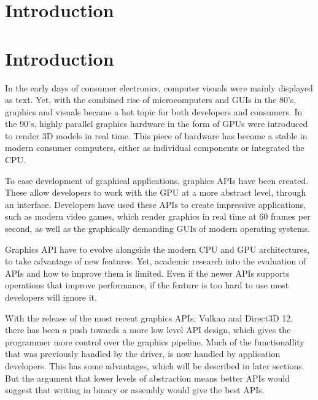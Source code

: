 \chapter{Introduction}\label{ch:introduction}
\chapter{Introduction}\label{ch:introduction}
In the early days of consumer electronics, computer visuals were mainly displayed as text.
Yet, with the combined rise of microcomputers and \glspl{GUI} in the 80's, graphics and visuals became a hot topic for both developers and consumers.  
In the 90's, highly parallel graphics hardware in the form of GPUs were introduced to render 3D models in real time.
This piece of hardware has become a stable in modern consumer computers, either as individual components or integrated the CPU.

To ease development of graphical applications, graphics \glspl{API} have been created. 
These allow developers to work with the GPU at a more abstract level, through an interface.
Developers have used these \glspl{API} to create impressive applications, such as modern video games, which render graphics in real time at 60 frames per second, as well as the graphically demanding \glspl{GUI} of modern operating systems.

Graphics \gls{API} have to evolve alongside the modern CPU and GPU architectures, to take advantage of new features. 
Yet, academic research into the evaluation of \glspl{API} and how to improve them is limited.
Even if the newer \glspl{API} supports operations that improve performance, if the feature is too hard to use most developers will ignore it.

With the release of the most recent graphics \glspl{API}; Vulkan and Direct3D 12, there has been a push towards a more low level API design, which gives the programmer more control over the graphics pipeline.
Much of the functionallity that was previously handled by the driver, is now handled by application developers. 
This has some advantages, which will be described in later sections. 
But the argument that lower levels of abstraction means better \glspl{API} would suggest that writing in binary or assembly would give the best \glspl{API}.

